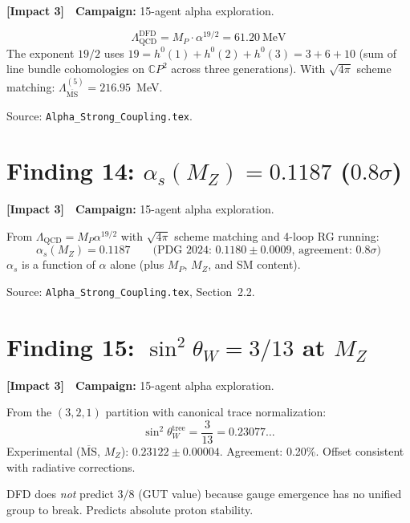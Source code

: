 \documentclass[11pt,a4paper]{article}
\newcommand{\impactthree}{\textcolor{impact3}{\textbf{[Impact 3]}}}
\newcommand{\CP}{\mathbb{C}P}
\begin{document}
\impactthree\ \ \textbf{Campaign:} 15-agent alpha exploration.

\begin{equation}
\Lambda_{\mathrm{QCD}}^{\mathrm{DFD}} = M_P \cdot \alpha^{19/2} = 61.20~\text{MeV}
\end{equation}
The exponent $19/2$ uses $19 = h^0(1) + h^0(2) + h^0(3) = 3 + 6 + 10$
(sum of line bundle cohomologies on $\CP^2$ across three generations).
With $\sqrt{4\pi}$ scheme matching: $\Lambda_{\overline{\mathrm{MS}}}^{(5)}
= 216.95$~MeV.

Source: \texttt{Alpha\_Strong\_Coupling.tex}.


\section{Finding 14: $\alpha_s(M_Z) = 0.1187$ ($0.8\sigma$)}
\label{sec:alpha-s}

\impactthree\ \ \textbf{Campaign:} 15-agent alpha exploration.

From $\Lambda_{\mathrm{QCD}} = M_P\alpha^{19/2}$ with $\sqrt{4\pi}$
scheme matching and 4-loop RG running:
\[
\alpha_s(M_Z) = 0.1187 \qquad\text{(PDG 2024: }0.1180 \pm 0.0009\text{, agreement: }0.8\sigma\text{)}
\]
$\alpha_s$ is a function of $\alpha$ alone (plus $M_P$, $M_Z$, and SM content).

Source: \texttt{Alpha\_Strong\_Coupling.tex}, Section~2.2.


\section{Finding 15: $\sin^2\theta_W = 3/13$ at $M_Z$}
\label{sec:weinberg}

\impactthree\ \ \textbf{Campaign:} 15-agent alpha exploration.

From the $(3,2,1)$ partition with canonical trace normalization:
\[
\sin^2\theta_W^{\mathrm{tree}} = \frac{3}{13} = 0.23077\ldots
\]
Experimental ($\overline{\mathrm{MS}}$, $M_Z$): $0.23122 \pm 0.00004$.
Agreement: 0.20\%. Offset consistent with radiative corrections.

DFD does \emph{not} predict $3/8$ (GUT value) because gauge emergence
has no unified group to break. Predicts absolute proton stability.
\end{document}
